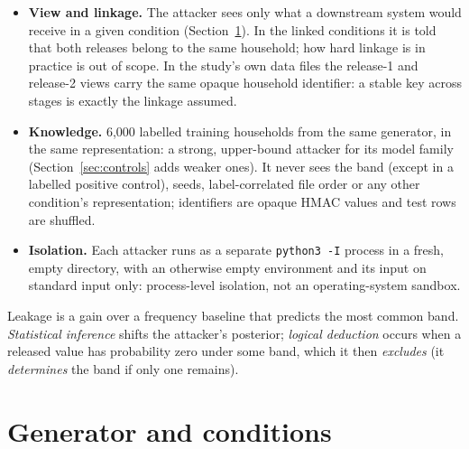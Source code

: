 \documentclass[11pt]{article}
\newcommand{\code}[1]{\texttt{#1}}
\begin{document}
\begin{itemize}
  \item \textbf{View and linkage.} The attacker sees only what a downstream system would receive in a given condition (Section~\ref{sec:conditions}). In the linked conditions it is told that both releases belong to the same household; how hard linkage is in practice is out of scope. In the study's own data files the release-1 and release-2 views carry the same opaque household identifier: a stable key across stages is exactly the linkage assumed.
  \item \textbf{Knowledge.} 6,000 labelled training households from the same generator, in the same representation: a strong, upper-bound attacker for its model family (Section~\ref{sec:controls} adds weaker ones). It never sees the band (except in a labelled positive control), seeds, label-correlated file order or any other condition's representation; identifiers are opaque HMAC values and test rows are shuffled.
  \item \textbf{Isolation.} Each attacker runs as a separate \code{python3 -I} process in a fresh, empty directory, with an otherwise empty environment and its input on standard input only: process-level isolation, not an operating-system sandbox.
\end{itemize}

Leakage is a gain over a frequency baseline that predicts the most common band. \emph{Statistical inference} shifts the attacker's posterior; \emph{logical deduction} occurs when a released value has probability zero under some band, which it then \emph{excludes} (it \emph{determines} the band if only one remains).

\section{Generator and conditions}
\label{sec:conditions}
\end{document}
